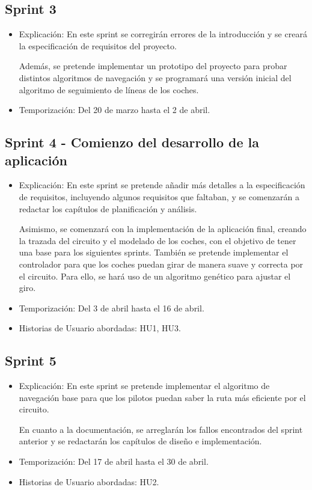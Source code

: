 \subsection{Sprint 3}
\begin{itemize}
    \item Explicación: En este sprint se corregirán errores de la introducción y se creará la especificación de requisitos del proyecto.
    
    Además, se pretende implementar un prototipo del proyecto para probar distintos algoritmos de navegación y se programará una versión inicial del algoritmo de seguimiento de líneas de los coches.
    \item Temporización: Del 20 de marzo hasta el 2 de abril.
\end{itemize}


\subsection{Sprint 4 - Comienzo del desarrollo de la aplicación}
\begin{itemize}
    \item Explicación: En este sprint se pretende añadir más detalles a la especificación de requisitos, incluyendo algunos requisitos que faltaban, y se comenzarán a redactar los capítulos de planificación y análisis.
    
    Asimismo, se comenzará con la implementación de la aplicación final, creando la trazada del circuito y el modelado de los coches, con el objetivo de tener una base para los siguientes sprints. También se pretende implementar el controlador para que los coches puedan girar de manera suave y correcta por el circuito. Para ello, se hará uso de un algoritmo genético para ajustar el giro.

    \item Temporización: Del 3 de abril hasta el 16 de abril.
    \item Historias de Usuario abordadas: HU1, HU3.
\end{itemize}

\subsection{Sprint 5}
\begin{itemize}
    \item Explicación: En este sprint se pretende implementar el algoritmo de navegación base para que los pilotos puedan saber la ruta más eficiente por el circuito.


    En cuanto a la documentación, se arreglarán los fallos encontrados del sprint anterior y se redactarán los capítulos de diseño e implementación.

    \item Temporización: Del 17 de abril hasta el 30 de abril.
    \item Historias de Usuario abordadas: HU2.
\end{itemize}

